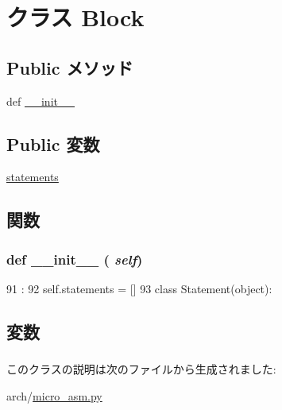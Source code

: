\hypertarget{classmicro__asm_1_1Block}{
\section{クラス Block}
\label{classmicro__asm_1_1Block}
}
\subsection*{Public メソッド}
\begin{DoxyCompactItemize}
\item 
def \hyperlink{classmicro__asm_1_1Block_ac775ee34451fdfa742b318538164070e}{\_\-\_\-init\_\-\_\-}
\end{DoxyCompactItemize}
\subsection*{Public 変数}
\begin{DoxyCompactItemize}
\item 
\hyperlink{classmicro__asm_1_1Block_aa25d5649a404c698dcacaa271a285c92}{statements}
\end{DoxyCompactItemize}


\subsection{関数}
\hypertarget{classmicro__asm_1_1Block_ac775ee34451fdfa742b318538164070e}{
\subsubsection[{\_\-\_\-init\_\-\_\-}]{\setlength{\rightskip}{0pt plus 5cm}def \_\-\_\-init\_\-\_\- ( {\em self})}}
\label{classmicro__asm_1_1Block_ac775ee34451fdfa742b318538164070e}



\begin{DoxyCode}
91                       :
92         self.statements = []
93 
class Statement(object):
\end{DoxyCode}


\subsection{変数}
\hypertarget{classmicro__asm_1_1Block_aa25d5649a404c698dcacaa271a285c92}{
\subsubsection[{statements}]{}}
\label{classmicro__asm_1_1Block_aa25d5649a404c698dcacaa271a285c92}


このクラスの説明は次のファイルから生成されました:\begin{DoxyCompactItemize}
\item 
arch/\hyperlink{micro__asm_8py}{micro\_\-asm.py}\end{DoxyCompactItemize}
